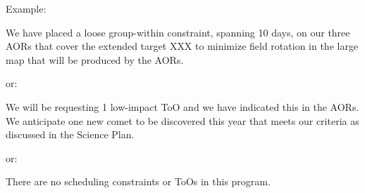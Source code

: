 \documentclass[letterpaper,12pt]{article}
\begin{document}
\noindent Example:

We have placed a loose group-within constraint, spanning 10 days,
on our three AORs that cover the extended target XXX to 
minimize field rotation in the large map that will be produced by the AORs.\newline

\noindent or:\noindent 

We will be requesting 1 low-impact ToO and we have indicated this in the 
AORs.  We anticipate one new comet to be discovered this year that meets 
our criteria as discussed in the Science Plan.\newline

\noindent or:

There are no scheduling constraints or ToOs in this program.
\end{document}
